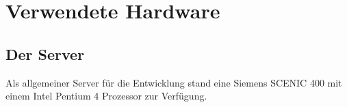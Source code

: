 \newpage
\section{Verwendete Hardware}

\subsection{Der Server}

Als allgemeiner Server f\"ur die Entwicklung stand eine Siemens SCENIC 400 mit einem Intel Pentium 4 
Prozessor zur Verf\"ugung. 





